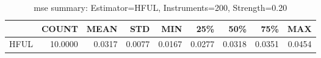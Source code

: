 \begin{table}[ht]
\centering
\caption{mse summary: Estimator=HFUL, Instruments=200, Strength=0.20}
\begin{tabular}{lrrrrrrrr}
\toprule
 & COUNT & MEAN & STD & MIN & 25\% & 50\% & 75\% & MAX \\
\midrule
HFUL & 10.0000 & 0.0317 & 0.0077 & 0.0167 & 0.0277 & 0.0318 & 0.0351 & 0.0454 \\
\bottomrule
\end{tabular}
\end{table}
